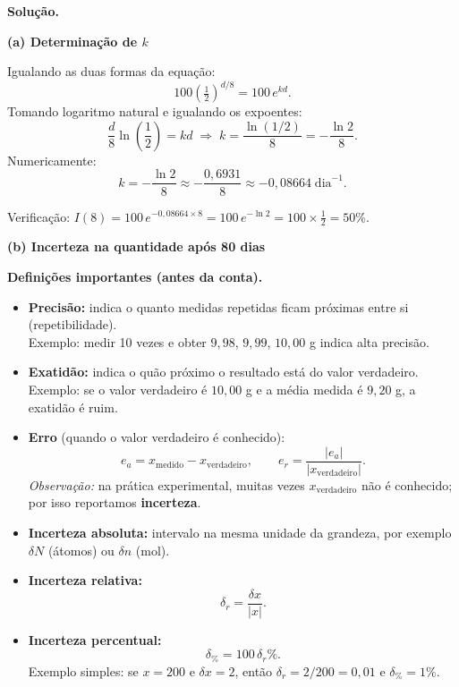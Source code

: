 \documentclass[12pt,a4paper]{article}
\theoremstyle{definition}
\newenvironment{solucao}{%
  \par\medskip\noindent\textbf{Solu\c{c}\~ao.}\quad\ignorespaces
}{%
  \par\medskip
}
\begin{document}
\begin{solucao}

\noindent\textbf{(a) Determinação de $k$}

Igualando as duas formas da equa\c{c}\~ao:
\[
  100\!\left(\tfrac{1}{2}\right)^{d/8} = 100\,e^{kd}.
\]
Tomando logaritmo natural e igualando os expoentes:
\[
  \frac{d}{8}\ln\!\left(\frac{1}{2}\right) = kd \;\Longrightarrow\; k = \frac{\ln(1/2)}{8} = -\frac{\ln 2}{8}.
\]
Numericamente:
\begin{equation}
  \boxed{k = -\frac{\ln 2}{8} \approx -\frac{0{,}6931}{8} \approx -0{,}08664\;\text{dia}^{-1}.}
\end{equation}

Verifica\c{c}\~ao: $I(8) = 100\,e^{-0{,}08664\times 8} = 100\,e^{-\ln 2} = 100 \times \tfrac{1}{2} = 50\%$. \checkmark

\medskip
\noindent\textbf{(b) Incerteza na quantidade ap\'os 80 dias}

\medskip
\noindent\textbf{Defini\c{c}\~oes importantes (antes da conta).}
\begin{itemize}
  \item \textbf{Precis\~ao:} indica o quanto medidas repetidas ficam pr\'oximas entre si (repetibilidade).\\
  Exemplo: medir 10 vezes e obter $9{,}98$, $9{,}99$, $10{,}00$ g indica alta precis\~ao.

  \item \textbf{Exatid\~ao:} indica o qu\~ao pr\'oximo o resultado est\'a do valor verdadeiro.\\
  Exemplo: se o valor verdadeiro \'e $10{,}00$ g e a m\'edia medida \'e $9{,}20$ g, a exatid\~ao \'e ruim.

  \item \textbf{Erro} (quando o valor verdadeiro \'e conhecido):
  \[
    e_a = x_{\text{medido}} - x_{\text{verdadeiro}},
    \qquad
    e_r = \frac{|e_a|}{|x_{\text{verdadeiro}}|}.
  \]
  \textit{Observa\c{c}\~ao:} na pr\'atica experimental, muitas vezes $x_{\text{verdadeiro}}$ n\~ao \'e conhecido; por isso reportamos \textbf{incerteza}.

  \item \textbf{Incerteza absoluta:} intervalo na mesma unidade da grandeza, por exemplo $\delta N$ (\'atomos) ou $\delta n$ (mol).

  \item \textbf{Incerteza relativa:}
  \[
    \delta_r = \frac{\delta x}{|x|}.
  \]

  \item \textbf{Incerteza percentual:}
  \[
    \delta_\% = 100\,\delta_r\%.
  \]
  Exemplo simples: se $x=200$ e $\delta x=2$, ent\~ao $\delta_r=2/200=0{,}01$ e $\delta_\%=1\%$.
\end{itemize}


\end{solucao}
\end{document}
